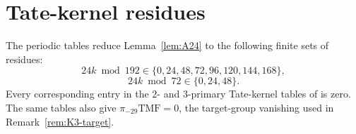 \documentclass[11pt,a4paper]{amsart}
\newcommand{\TMF}{\mathrm{TMF}}
\theoremstyle{plain}
\theoremstyle{definition}
\theoremstyle{remark}
\begin{document}
\section{Tate-kernel residues}\label{app:tate-residues}

The periodic tables reduce Lemma~\ref{lem:A24} to the following
finite sets of residues:
\[
 24k\bmod192\in\{0,24,48,72,96,120,144,168\},
\]
\[
 24k\bmod72\in\{0,24,48\}.
\]
Every corresponding entry in the $2$- and $3$-primary
Tate-kernel tables of \cite[Appendix~C]{TY} is zero.
The same tables also give $\pi_{-29}\TMF=0$, the
target-group vanishing used in Remark~\ref{rem:K3-target}.

\begingroup
\raggedright


\endgroup
\end{document}
